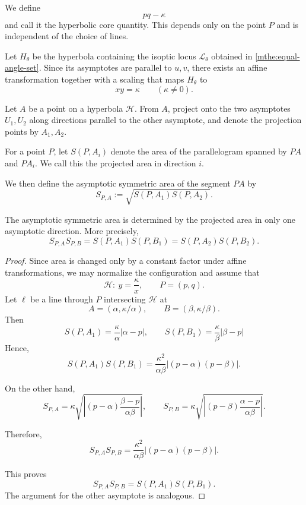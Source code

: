 \documentclass[12pt]{article}
\begin{document}
\begin{definition}
\label{def:hyperbolic-core-quantity}
We define
\[
pq-\kappa
\]
and call it the hyperbolic core quantity.
This depends only on the point $P$
and is independent of the choice of lines.
\end{definition}

\begin{lemma}
\label{lem:affine-normalize}
Let $H_\theta$ be the hyperbola containing the isoptic locus $\mathcal L_\theta$
obtained in \cref{mthe:equal-angle-set}.
Since its asymptotes are parallel to $u,v$,
there exists an affine transformation together with a scaling
that maps $H_\theta$ to
\[
xy=\kappa \qquad (\kappa\neq0).
\]
\end{lemma}

\begin{definition}
\label{def:projection-area}
Let $A$ be a point on a hyperbola $\mathcal H$.
From $A$, project onto the two asymptotes $U_1,U_2$
along directions parallel to the other asymptote,
and denote the projection points by $A_1,A_2$.

For a point $P$, let $S(P,A_i)$ denote the area of the parallelogram
spanned by $PA$ and $PA_i$.
We call this the projected area in direction $i$.

We then define the asymptotic symmetric area of the segment $PA$ by
\[
S_{P,A}:=\sqrt{S(P,A_1)S(P,A_2)}.
\]
\end{definition}

\begin{proposition}
\label{prop:one-sided-determinacy}
The asymptotic symmetric area is determined by the projected area
in only one asymptotic direction.
More precisely,
\[
S_{P,A}S_{P,B}
=
S(P,A_1)S(P,B_1)
=
S(P,A_2)S(P,B_2).
\]
\end{proposition}

\begin{proof}
Since area is changed only by a constant factor under affine transformations,
we may normalize the configuration and assume that
\[
\mathcal H:\ y=\frac{\kappa}{x},\qquad P=(p,q).
\]
Let $\ell$ be a line through $P$ intersecting $\mathcal H$ at
\[
A=(\alpha,\kappa/\alpha),\qquad B=(\beta,\kappa/\beta).
\]
Then
\[
S(P,A_1)=\frac{\kappa}{\alpha}|\alpha-p|,\qquad
S(P,B_1)=\frac{\kappa}{\beta}|\beta-p|
\]
Hence,
\[
S(P,A_1)S(P,B_1)
=
\frac{\kappa^2}{\alpha\beta}|(p-\alpha)(p-\beta)|.
\]

On the other hand,
\[
S_{P,A}
=
\kappa\sqrt{\left|(p-\alpha)\frac{\beta-p}{\alpha\beta}\right|},\qquad
S_{P,B}
=
\kappa\sqrt{\left|(p-\beta)\frac{\alpha-p}{\alpha\beta}\right|}.
\]

Therefore,
\[
S_{P,A}S_{P,B}
=
\frac{\kappa^2}{\alpha\beta}|(p-\alpha)(p-\beta)|.
\]

This proves
\[
S_{P,A}S_{P,B}=S(P,A_1)S(P,B_1).
\]
The argument for the other asymptote is analogous.
\end{proof}
\end{document}
